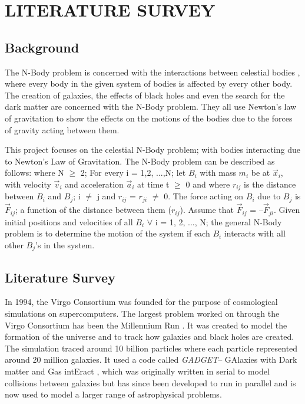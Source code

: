 \documentclass[letterpaper, 10 pt, conference]{ieeeconf}
\begin{document}
    \section{LITERATURE SURVEY}

    \subsection{Background}

    The N-Body problem is concerned with the interactions between celestial bodies \cite{c5}, where every body in the given system of bodies is affected by every other body. The creation of galaxies, the effects of black holes and even the search for the dark matter are concerned with the N-Body problem. They all use Newton’s law of gravitation to show the effects on the motions of the bodies due to the forces of gravity acting between them.\par

    This project focuses on the celestial N-Body problem; with bodies interacting due to Newton’s Law of Gravitation. The N-Body problem can be described as follows: where N $\geq$ 2; For every i = 1,2, ...,N; let $B_i$ with mass $m_i$ be at $\vec{x}_i$, with velocity $\vec{v}_i$ and acceleration $\vec{a}_i$ at time t $\geq$ 0 and where $r_{ij}$ is the distance between $B_i$ and $B_j$; i $\neq$ j and $r_{ij}$ = $r_{ji}$ $\neq$ 0. The force acting on $B_i$ due to $B_j$ is $\vec{F}_{ij}$; a function of the distance between them ($r_{ij}$). Assume that $\vec{F}_{ij}$ = {--}$\vec{F}_{ji}$. Given initial positions and velocities of all $B_i$ $\forall$ i = 1, 2, ..., N; the general N-Body problem is to determine the motion of the system if each $B_i$ interacts with all other $B_j$’s in the system.

    \subsection{Literature Survey}

    In 1994, the Virgo Consortium was founded for the purpose of cosmological simulations on supercomputers. The largest problem worked on through the Virgo Consortium has been the Millennium Run \cite{c6}. It was created to model the formation of the universe and to track how galaxies and black holes are created. The simulation traced around 10 billion particles where each particle represented around 20 million galaxies. It used a code called \textit{GADGET}{--} GAlaxies with Dark matter and Gas intEract \cite{c7}, which was originally written in serial to model collisions between galaxies but has since been developed to run in parallel and is now used to model a larger range of astrophysical problems. \par
\end{document}
